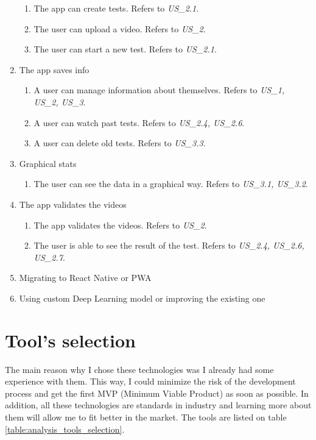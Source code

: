 \begin{enumerate}[label=\textbf{MIL\_\arabic*}, align=left, leftmargin=*]
        \begin{enumerate}[label=\textbf{\theenumi.\arabic*}, align=left, leftmargin=*]
            \item The app can create tests. Refers to \textit{US\_2.1}.
            \item The user can upload a video. Refers to \textit{US\_2}.
            \item The user can start a new test. Refers to \textit{US\_2.1}.
        \end{enumerate}
    \item The app saves info
        \begin{enumerate}[label=\textbf{\theenumi.\arabic*}, align=left, leftmargin=*]
            \item A user can manage information about themselves. Refers to \textit{US\_1, US\_2, US\_3}.
            \item A user can watch past tests. Refers to \textit{US\_2.4, US\_2.6}.
            \item A user can delete old tests. Refers to \textit{US\_3.3}.
        \end{enumerate}
    \item Graphical stats
        \begin{enumerate}[label=\textbf{\theenumi.\arabic*}, align=left, leftmargin=*]
            \item The user can see the data in a graphical way. Refers to \textit{US\_3.1, US\_3.2}.
        \end{enumerate}
    \item The app validates the videos
        \begin{enumerate}[label=\textbf{\theenumi.\arabic*}, align=left, leftmargin=*]
            \item The app validates the videos. Refers to \textit{US\_2}.
            \item The user is able to see the result of the test.  Refers to \textit{US\_2.4, US\_2.6, US\_2.7}.
        \end{enumerate}
    \item Migrating to React Native or PWA
    \item Using custom Deep Learning model or improving the existing one
\end{enumerate}
  
\section{Tool's selection}
The main reason why I chose these technologies was I already had some experience with them.
This way, I could minimize the risk of the development process and get the first MVP (Minimum Viable Product) as soon as possible.
In addition, all these technologies are standards in industry and learning more about them will allow me to fit better in the market.
The tools are listed on table \ref{table:analysis_tools_selection}. \\ 

